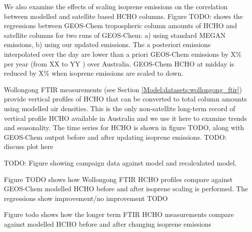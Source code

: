       
    
      We also examine the effects of scaling isoprene emissions on the correlation between modelled and satellite based HCHO columns.
      Figure TODO: shows the regressions between GEOS-Chem tropospheric column amounts of HCHO and satellite columns for two runs of GEOS-Chem: a) using standard MEGAN emissions, b) using our updated emissions.
      The a posteriori emissions interpolated over the day are lower than a priori GEOS-Chem emissions by X\% per year (from XX to YY \tgpyr) over Australia.
      GEOS-Chem HCHO at midday is reduced by X\% when isoprene emissions are scaled to down.
      
      Wollongong FTIR measurements (see Section \ref{Model:datasets:wollongong_ftir}) provide vertical profiles of HCHO that can be converted to total column amounts using modelled air densities.
      This is the only non-satellite long-term record of vertical profile HCHO available in Australia and we use it here to examine trends and seasonality.
      The time series for HCHO is shown in figure TODO, along with GEOS-Chem output before and after updating isoprene emissions.
      TODO: discuss plot here
      
      TODO: Figure showing campaign data against model and recalculated model.
      
      
      Figure TODO shows how Wollongong FTIR HCHO profiles compare against GEOS-Chem modelled HCHO before and after isoprene scaling is performed. 
      The regressions show improvement/no improvement TODO 
      
      Figure todo shows how the longer term FTIR HCHO measurements compare against modelled HCHO before and after changing isoprene emissions
  
